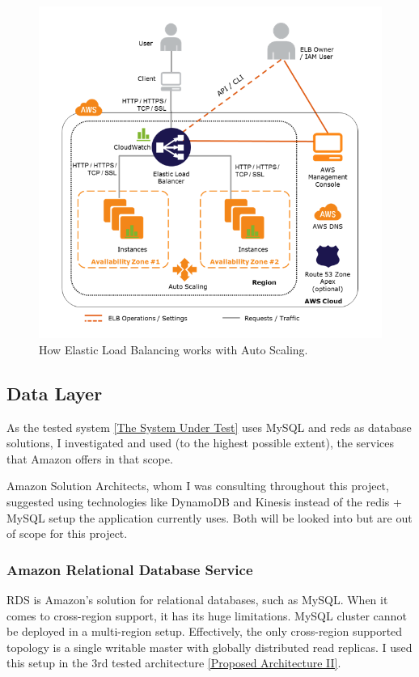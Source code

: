 \documentclass{uvamscse}
\begin{document}
\begin{figure}[H]
\centering
\includegraphics[scale=0.5]{elbautoscale}
\caption{How Elastic Load Balancing works with Auto Scaling.}
\label{figure:elbautoscale}
\end{figure}

\subsection{Data Layer}
As the tested system \ref{The System Under Test} uses MySQL and reds as database solutions, I investigated and used (to the highest possible extent), the services that Amazon offers in that scope.

Amazon Solution Architects, whom I was consulting throughout this project, suggested using technologies like DynamoDB and Kinesis instead of the redis + MySQL setup the application currently uses. Both will be looked into but are out of scope for this project.

\subsubsection{Amazon Relational Database Service}

RDS is Amazon's solution for relational databases, such as MySQL. When it comes to cross-region support, it has its huge limitations. MySQL cluster cannot be deployed in a multi-region setup. Effectively, the only cross-region supported topology is a single writable master with globally distributed read replicas. I used this setup in the 3rd tested architecture \ref{Proposed Architecture II}.
\end{document}
